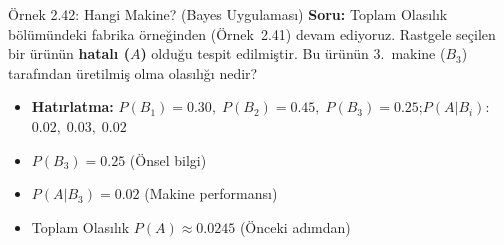 \documentclass[light]{lutbeamer}
\begin{document}
\begin{frame}{Örnek 2.42: Hangi Makine? (Bayes Uygulaması)}
    \small
    \textbf{Soru:} Toplam Olasılık bölümündeki fabrika örneğinden (Örnek~2.41) devam ediyoruz. Rastgele seçilen bir ürünün \textbf{hatalı ($A$)} olduğu tespit edilmiştir. Bu ürünün 3.~makine ($B_3$) tarafından üretilmiş olma olasılığı nedir?

    \begin{itemize}
        \item \textbf{Hatırlatma:} $P(B_1)=0.30,\; P(B_2)=0.45,\; P(B_3)=0.25$;\quad $P(A|B_i)$: $0.02,\; 0.03,\; 0.02$
        \item $P(B_3)=0.25$ (Önsel bilgi)
        \item $P(A|B_3)=0.02$ (Makine performansı)
        \item Toplam Olasılık $P(A) \approx 0.0245$ (Önceki adımdan)
    \end{itemize}


\end{frame}
\end{document}
